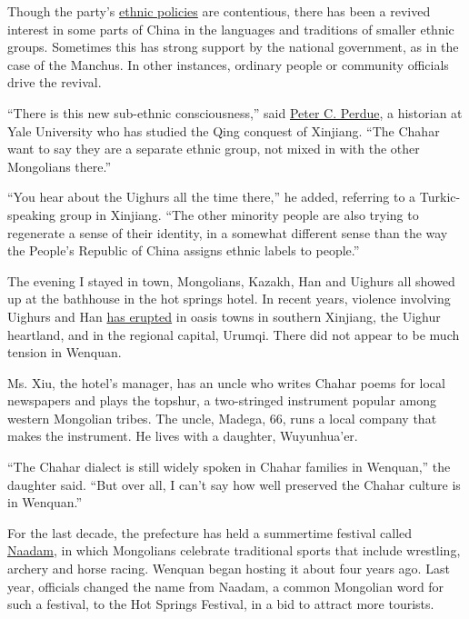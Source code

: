 Though the party's
\href{https://www.nytimes3xbfgragh.onion/2015/11/29/world/asia/china-tibet-language-education.html?mcubz=2}{ethnic
policies} are contentious, there has been a revived interest in some
parts of China in the languages and traditions of smaller ethnic groups.
Sometimes this has strong support by the national government, as in the
case of the Manchus. In other instances, ordinary people or community
officials drive the revival.

``There is this new sub-ethnic consciousness,'' said
\href{http://history.yale.edu/people/peter-c-perdue}{Peter C. Perdue}, a
historian at Yale University who has studied the Qing conquest of
Xinjiang. ``The Chahar want to say they are a separate ethnic group, not
mixed in with the other Mongolians there.''

``You hear about the Uighurs all the time there,'' he added, referring
to a Turkic-speaking group in Xinjiang. ``The other minority people are
also trying to regenerate a sense of their identity, in a somewhat
different sense than the way the People's Republic of China assigns
ethnic labels to people.''

The evening I stayed in town, Mongolians, Kazakh, Han and Uighurs all
showed up at the bathhouse in the hot springs hotel. In recent years,
violence involving Uighurs and Han
\href{http://www.nytimes3xbfgragh.onion/2009/07/12/weekinreview/12wong.html?mcubz=2}{has
erupted} in oasis towns in southern Xinjiang, the Uighur heartland, and
in the regional capital, Urumqi. There did not appear to be much tension
in Wenquan.

Ms. Xiu, the hotel's manager, has an uncle who writes Chahar poems for
local newspapers and plays the topshur, a two-stringed instrument
popular among western Mongolian tribes. The uncle, Madega, 66, runs a
local company that makes the instrument. He lives with a daughter,
Wuyunhua'er.

``The Chahar dialect is still widely spoken in Chahar families in
Wenquan,'' the daughter said. ``But over all, I can't say how well
preserved the Chahar culture is in Wenquan.''

For the last decade, the prefecture has held a summertime festival
called
\href{http://www.nytimes3xbfgragh.onion/2008/07/11/world/asia/11mongolia.html?mcubz=2}{Naadam},
in which Mongolians celebrate traditional sports that include wrestling,
archery and horse racing. Wenquan began hosting it about four years ago.
Last year, officials changed the name from Naadam, a common Mongolian
word for such a festival, to the Hot Springs Festival, in a bid to
attract more tourists.

